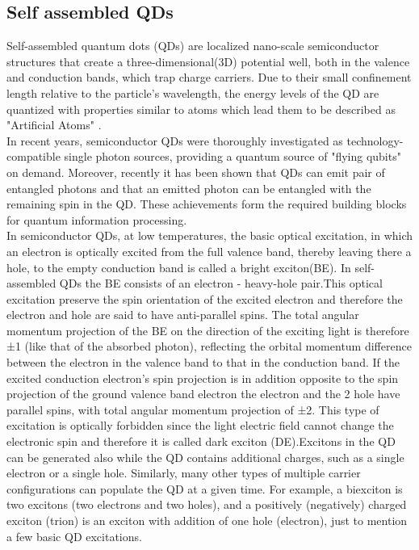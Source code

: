   	\subsection{Self assembled QDs}
	Self-assembled quantum dots (QDs) are localized nano-scale semiconductor structures that create a three-dimensional(3D) potential well, both in the valence and conduction bands, which trap charge carriers. Due to their small confinement length relative to the particle's wavelength, the energy levels of the QD are quantized with properties similar to atoms which lead them to be described as "Artificial Atoms" \cite{Kastner1993}. \\
In recent years, semiconductor QDs were thoroughly investigated as technology-compatible single photon sources, providing a quantum source of "flying qubits" on demand.\cite{Dekel2000,Michler2000,Michler2000_1,Yuan2002} Moreover, recently it has been shown that QDs can emit pair of entangled photons \cite{Akopian2006,Hafenbrak2007} and that an emitted photon can be entangled with the remaining spin in the QD. \cite{Pelk2012,Schaibley2013,Gao2012} These achievements form the required building blocks for quantum information processing. \cite{DiVincenzo1998,Duan2001}\\
In semiconductor QDs, at low temperatures, the basic optical excitation, in which an electron is optically excited from the full valence band, thereby leaving there a hole, to the empty conduction band is called a bright exciton(BE). In self-assembled QDs the BE consists of an electron - heavy-hole pair.This optical excitation preserve the spin orientation of the excited electron and therefore the electron and hole are said to have anti-parallel spins. The total angular momentum projection of the BE on the direction of the exciting light is therefore ±1 (like that of the absorbed photon), reflecting the orbital momentum difference between the electron in the valence band to that in the conduction band.
If the excited conduction electron's spin projection is in addition opposite to the spin projection of the ground valence band electron the electron and the 2 hole have parallel spins, with total angular momentum projection of ±2. This type of excitation is optically forbidden since the light electric field cannot change the electronic spin and therefore it is called dark exciton (DE).Excitons in the QD can be generated also while the QD contains additional charges, such as a single electron or a single hole. Similarly, many other types of multiple carrier configurations can populate the QD at a given time. For example, a biexciton is two excitons (two electrons and two holes), and a positively (negatively) charged exciton (trion) is an exciton with addition of one hole (electron), just to mention a few basic QD excitations.

